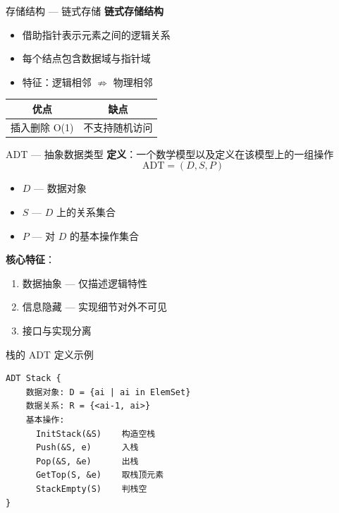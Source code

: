 \documentclass[10pt, aspectratio=169]{beamer}
\begin{document}
\begin{frame}{存储结构 --- 链式存储}
    \textbf{链式存储结构}
    \begin{itemize}
        \item 借助指针表示元素之间的逻辑关系
        \item 每个结点包含数据域与指针域
        \item 特征：逻辑相邻 $\nRightarrow$ 物理相邻
    \end{itemize}
    \vspace{0.5em}
    \begin{center}
    \begin{tabular}{|c|c|}
        \hline
        \textbf{优点} & \textbf{缺点} \\
        \hline
        插入删除 O(1) & 不支持随机访问 \\
        \hline
    \end{tabular}
    \end{center}
\end{frame}

\begin{frame}{ADT --- 抽象数据类型}
    \textbf{定义}：一个数学模型以及定义在该模型上的一组操作
    \[
    \text{ADT} = (D, S, P)
    \]
    \begin{itemize}
        \item $D$ --- 数据对象
        \item $S$ --- $D$ 上的关系集合
        \item $P$ --- 对 $D$ 的基本操作集合
    \end{itemize}
    \vspace{0.5em}
    \textbf{核心特征}：
    \begin{enumerate}
        \item 数据抽象 --- 仅描述逻辑特性
        \item 信息隐藏 --- 实现细节对外不可见
        \item 接口与实现分离
    \end{enumerate}
\end{frame}

\begin{frame}[fragile]{栈的 ADT 定义示例}
    \begin{center}
    \begin{minipage}{0.85\textwidth}
    \begin{verbatim}
ADT Stack {
    数据对象: D = {ai | ai in ElemSet}
    数据关系: R = {<ai-1, ai>}
    基本操作:
      InitStack(&S)    构造空栈
      Push(&S, e)      入栈
      Pop(&S, &e)      出栈
      GetTop(S, &e)    取栈顶元素
      StackEmpty(S)    判栈空
}
    \end{verbatim}
    \end{minipage}
    \end{center}
\end{frame}
\end{document}
